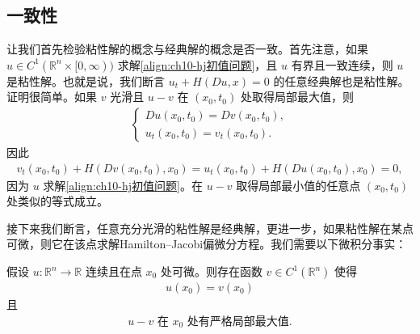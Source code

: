 \documentclass[../../main.tex]{subfiles}
\begin{document}
\subsection{一致性}\label{subsection:ch10-一致性}

让我们首先检验粘性解的概念与经典解的概念是否一致。首先注意，如果 $u\in C^1(\mathbb{R}^n\times[0,\infty))$ 求解\eqref{align:ch10-hj初值问题}，且 $u$ 有界且一致连续，则 $u$ 是粘性解。也就是说，我们断言 $u_t+H(Du,x)=0$ 的任意经典解也是粘性解。证明很简单。如果 $v$ 光滑且 $u-v$ 在 $(x_0,t_0)$ 处取得局部最大值，则
\begin{align*}
\begin{cases}
Du(x_0,t_0) = Dv(x_0,t_0),\\
u_t(x_0,t_0) = v_t(x_0,t_0).
\end{cases}
\end{align*}
因此
\begin{align*}
v_t(x_0,t_0)+H(Dv(x_0,t_0),x_0) = u_t(x_0,t_0)+H(Du(x_0,t_0),x_0)=0,
\end{align*}
因为 $u$ 求解\eqref{align:ch10-hj初值问题}。在 $u-v$ 取得局部最小值的任意点 $(x_0,t_0)$ 处类似的等式成立。

接下来我们断言，任意充分光滑的粘性解是经典解，更进一步，如果粘性解在某点可微，则它在该点求解Hamilton--Jacobi偏微分方程。我们需要以下微积分事实：

\begin{lemma}[由 $C^1$ 函数相切。]\label{lemma:ch10-C1函数相切}假设 $u:\mathbb{R}^n\to\mathbb{R}$ 连续且在点 $x_0$ 处可微。则存在函数 $v\in C^1(\mathbb{R}^n)$ 使得
\begin{align}
u(x_0) = v(x_0)
\label{align:ch10-相切条件1}
\end{align}
且
\begin{align}
u-v \text{ 在 } x_0 \text{ 处有严格局部最大值}.
\label{align:ch10-相切条件2}
\end{align}
\end{lemma}
\end{document}
